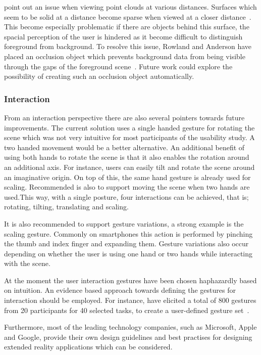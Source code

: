 \citeauthor{Bruder14} point out an issue when viewing point clouds at various distances. Surfaces which seem to be solid at a distance become sparse when viewed at a closer distance~\cite{Bruder14}. This become especially problematic if there are objects behind this surface, the spacial perception of the user is hindered as it become difficult to distinguish foreground from background. To resolve this issue, Rowland and Anderson have placed an occlusion object which prevents background data from being visible through the gaps of the foreground scene~\cite{Rowland10}. Future work could explore the possibility of creating such an occlusion object automatically.

\subsubsection{Interaction}
From an interaction perspective there are also several pointers towards future improvements. The current solution uses a single handed gesture for rotating the scene which was not very intuitive for most participants of the usability study. A two handed movement would be a better alternative. An additional benefit of using both hands to rotate the scene is that it also enables the rotation around an additional axis. For instance, users can easily tilt and rotate the scene around an imaginative origin. On top of this, the same hand gesture is already used for scaling. Recommended is also to support moving the scene when two hands are used.This way, with a single posture, four interactions can be achieved, that is; rotating, tilting, translating and scaling.

It is also recommended to support gesture variations, a strong example is the scaling gesture. Commonly on smartphones this action is performed by pinching the thumb and index finger and expanding them. Gesture variations also occur depending on whether the user is using one hand or two hands while interacting with the scene.

At the moment the user interaction gestures have been chosen haphazardly based on intuition. An evidence based approach towards defining the gestures for interaction should be employed. For instance, \citeauthor{Piumsomboon13} have elicited a total of 800 gestures from 20 participants for 40 selected tasks, to create a user-defined gesture set~\cite{Piumsomboon13}.

Furthermore, most of the leading technology companies, such as Microsoft, Apple and Google, provide their own design guidelines and best practises for designing extended reality applications which can be considered.

